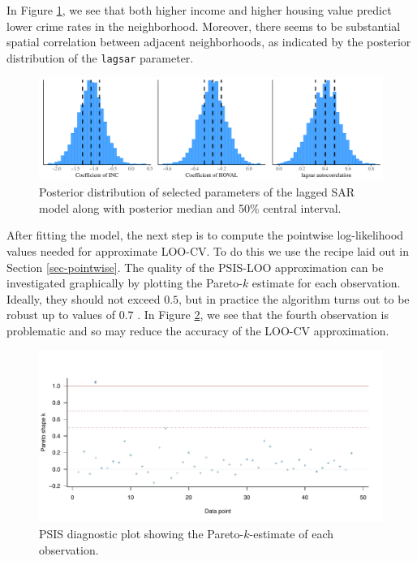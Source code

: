 \documentclass[11pt]{article}
\begin{document}
In Figure \ref{fig:plot-lagsar}, we see that both higher income and
higher housing value predict lower crime rates in the neighborhood.
Moreover, there seems to be substantial spatial correlation between
adjacent neighborhoods, as indicated by the posterior distribution of
the \texttt{lagsar} parameter.

\begin{figure}
\centering
\includegraphics[width=0.95\linewidth]{plot-lagsar-1.pdf}
\caption{Posterior distribution of selected
parameters of the lagged SAR model along with posterior median and 50\%
central interval.}
\label{fig:plot-lagsar}
\end{figure}


After fitting the model, the next step is to compute the pointwise
log-likelihood values needed for approximate LOO-CV. To do this we use
the recipe laid out in Section \ref{sec-pointwise}. The quality of the PSIS-LOO
approximation can be investigated graphically by plotting the Pareto-\(k\) 
estimate for each observation. Ideally, they should not exceed \(0.5\), but 
in practice the algorithm turns out to be robust up to values of \(0.7\) 
\citep{vehtari2017loo,vehtari2017psis}. In Figure \ref{fig:psis-res-nb}, 
we see that the fourth observation is problematic and so may reduce the 
accuracy of the LOO-CV approximation.

\begin{figure}
\centering
\includegraphics[width=0.95\linewidth]{psis-res-nb-1.pdf}
\caption{PSIS diagnostic plot showing the
Pareto-\(k\)-estimate of each observation.}
\label{fig:psis-res-nb}
\end{figure}
\end{document}

